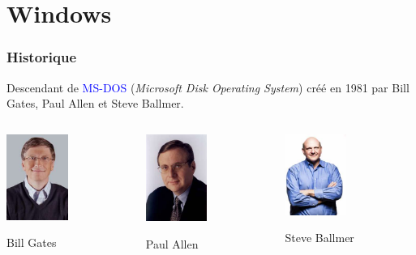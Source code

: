 \documentclass[aspectratio=169]{beamer}
\begin{document}
\section{Windows}

\begin{frame}
  \frametitle{Historique}
  Descendant de \textcolor{blue}{MS-DOS} (\textit{Microsoft Disk Operating
    System}) créé en 1981 par Bill Gates, Paul Allen et Steve Ballmer.

  \hspace{0.5cm}

  \begin{columns}
    \begin{column}{0.3 \textwidth}
      \centering
        \includegraphics[width=2cm]{textures/images/windows/gates.jpg}\par
      Bill Gates
    \end{column}
    \begin{column}{0.3 \textwidth}
      \centering
      \includegraphics[width=2cm]{textures/images/windows/allen.jpg}\par
      Paul Allen
    \end{column}
    \begin{column}{0.3 \textwidth}
      \centering
              \includegraphics[width=2cm]{textures/images/windows/ballmer.jpg}\par
      Steve Ballmer
    \end{column}
  \end{columns}

\end{frame}
\end{document}
